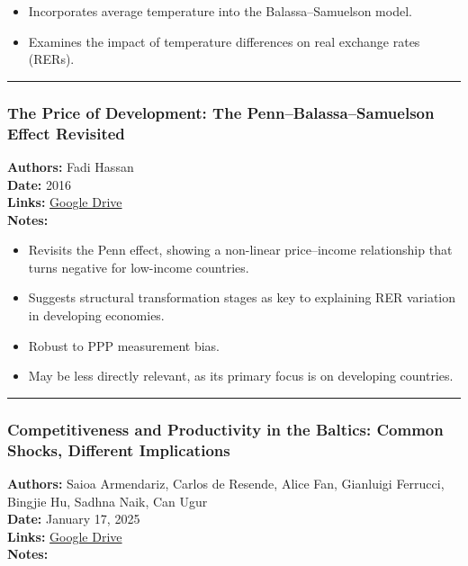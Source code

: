 \documentclass[
  11pt,
]{article}
\providecommand{\tightlist}{%
  \setlength{\itemsep}{0pt}\setlength{\parskip}{0pt}}
\begin{document}
\begin{itemize}
\tightlist
\item
  Incorporates average temperature into the Balassa--Samuelson model.
\item
  Examines the impact of temperature differences on real exchange rates
  (RERs).
\end{itemize}

\begin{center}\rule{0.5\linewidth}{0.5pt}\end{center}

\subsubsection{The Price of Development: The Penn--Balassa--Samuelson
Effect
Revisited}\label{the-price-of-development-the-pennbalassasamuelson-effect-revisited}

\textbf{Authors:} Fadi Hassan\\
\textbf{Date:} 2016\\
\textbf{Links:}
\href{https://drive.google.com/file/d/1bWMV2iq0ZnGvyt1L25UzIOewSEYH5uBC/view?usp=sharing}{Google
Drive}\\
\textbf{Notes:}

\begin{itemize}
\tightlist
\item
  Revisits the Penn effect, showing a non-linear price--income
  relationship that turns negative for low-income countries.
\item
  Suggests structural transformation stages as key to explaining RER
  variation in developing economies.
\item
  Robust to PPP measurement bias.
\item
  May be less directly relevant, as its primary focus is on developing
  countries.
\end{itemize}

\begin{center}\rule{0.5\linewidth}{0.5pt}\end{center}

\subsubsection{Competitiveness and Productivity in the Baltics: Common
Shocks, Different
Implications}\label{competitiveness-and-productivity-in-the-baltics-common-shocks-different-implications}

\textbf{Authors:} Saioa Armendariz, Carlos de Resende, Alice Fan,
Gianluigi Ferrucci, Bingjie Hu, Sadhna Naik, Can Ugur\\
\textbf{Date:} January 17, 2025\\
\textbf{Links:}
\href{https://drive.google.com/file/d/1GFUm5ckExKBUJ7CXxZ4ZyplTKT2Krc28/view?usp=sharing}{Google
Drive}\\
\textbf{Notes:}
\end{document}
